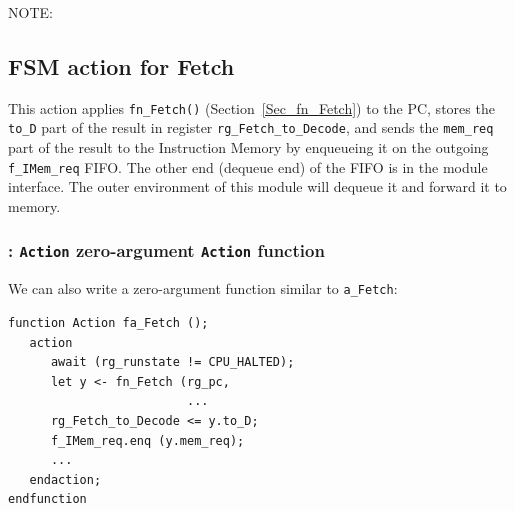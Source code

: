 \vspace{2ex}


NOTE: 


\subsection{FSM action for Fetch}


This action applies \verb|fn_Fetch()| (Section~\ref{Sec_fn_Fetch}) to
the PC, stores the \verb|to_D| part of the result in register
\verb|rg_Fetch_to_Decode|, and sends the \verb|mem_req| part of the
result to the Instruction Memory by enqueueing it on the outgoing
\verb|f_IMem_req| FIFO.  The other end (dequeue end) of the FIFO is in
the module interface.  The outer environment of this module will
dequeue it and forward it to memory.


\subsubsection{{\BSV}: {\tt Action} {\vs} zero-argument {\tt Action} function}

We can also write a zero-argument function similar to \verb|a_Fetch|:

{\footnotesize
\begin{Verbatim}[frame=single]
function Action fa_Fetch ();
   action
      await (rg_runstate != CPU_HALTED);
      let y <- fn_Fetch (rg_pc,
                         ...
      rg_Fetch_to_Decode <= y.to_D;
      f_IMem_req.enq (y.mem_req);
      ...
   endaction;
endfunction
\end{Verbatim}
}

